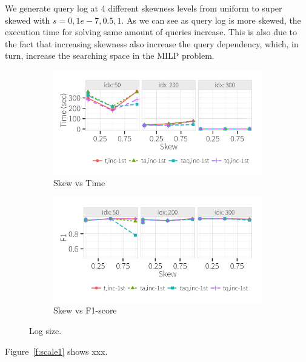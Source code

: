We generate query log at 4 different skewness levels from uniform to 
super skewed with $s = 0, 1e-7, 0.5, 1$. As we can see as query log
is more skewed, the execution time for solving same amount of queries 
increase. This is also due to the fact that increasing skewness also
increase the query dependency, which, in turn, increase the searching
space in the MILP problem.
 
  \begin{figure}[h]
    \centering
    \begin{subfigure}[t]{.9\columnwidth}
    \includegraphics[width = \columnwidth]{figures/skew_time}
    \caption{Skew vs Time}
    \label{f:multiquery} 
    \end{subfigure}
    \begin{subfigure}[t]{.9\columnwidth}
    \includegraphics[width = \columnwidth]{figures/skew_acc}
    \caption{Skew vs F1-score}
    \label{f:multiquery} 
    \end{subfigure}
    \caption{Log size. }
  \end{figure}





Figure~\ref{f:scale1} shows xxx.


